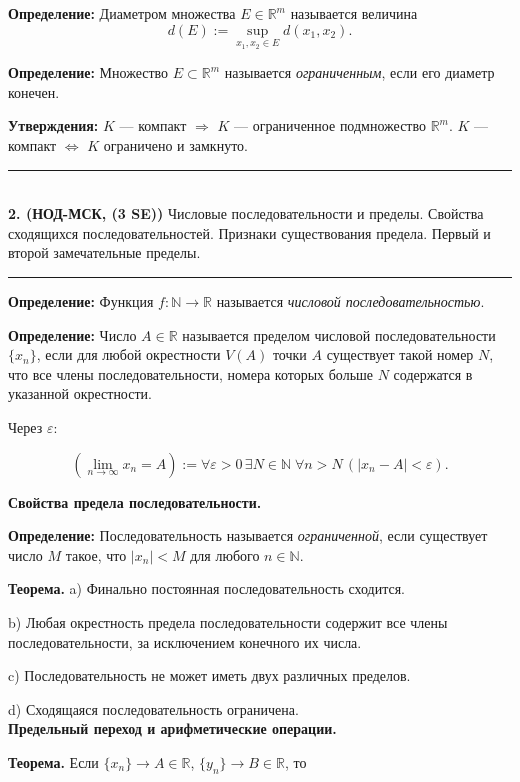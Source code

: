 \documentclass[12pt]{article}
\begin{document}
\textbf{Определение:} Диаметром множества $E \in \mathbb{R}^m$ называется величина
$$	
	d(E) := \sup_{x_1, x_2 \in E} d(x_1, x_2).
$$

\textbf{Определение:} Множество $E \subset \mathbb{R}^m$ называется \textit{ограниченным}, если его диаметр конечен.


\textbf{Утверждения:} $K$ --- компакт $\Rightarrow$ $K$ --- ограниченное подмножество $\mathbb{R}^m$. $K$ --- компакт $\Leftrightarrow$ $K$ ограничено и замкнуто. 

\noindent\rule{\textwidth}{1pt}
\\


\textbf{2. (НОД-МСК, (3 SE))} Числовые последовательности и пределы. Свойства сходящихся последовательностей. Признаки существования предела. Первый и второй замечательные пределы. 

\noindent\rule{\textwidth}{1pt}

\textbf{Определение:} Функция $f: \mathbb{N} \rightarrow \mathbb{R}$ называется \textit{числовой последовательностью}.

\textbf{Определение:} Число $A \in \mathbb{R}$ называется пределом числовой последовательности $\{ x_n \}$, если для любой окрестности $V(A)$ точки $A$ существует такой номер $N$, что все члены последовательности, номера которых больше $N$ содержатся в указанной окрестности.

Через $\varepsilon$:

$$
	(\lim_{n \rightarrow \infty} x_n = A) := \forall \varepsilon > 0 \, \exists N \in \mathbb{N} \; \forall n > N \, (|x_n - A| < \varepsilon).
$$

\textbf{Свойства предела последовательности.}

\textbf{Определение:} Последовательность называется \textit{ограниченной}, если существует число $M$ такое, что $|x_n| < M$ для любого $n \in \mathbb{N}$.


\textbf{Теорема.} a) Финально постоянная последовательность сходится.

b) Любая окрестность предела последовательности содержит все члены последовательности, за исключением конечного их числа.

c) Последовательность не может иметь двух различных пределов.

d) Сходящаяся последовательность ограничена. \\

\textbf{Предельный переход и арифметические операции.}

\textbf{Теорема.} Если $ \{ x_n \} \rightarrow A \in \mathbb{R}$, $\{ y_n \} \longrightarrow B \in \mathbb{R}$, то
\end{document}
